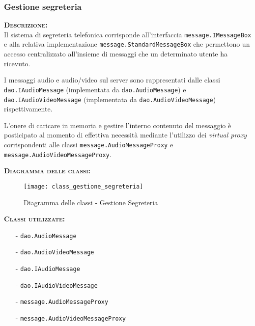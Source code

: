 \subsubsection{Gestione segreteria}
\begin{description}
	\item{\scshape\bfseries Descrizione:}\\
Il sistema di segreteria telefonica corrisponde all'interfaccia \texttt{message.IMessageBox} e alla relativa implementazione \texttt{message.StandardMessageBox} che permettono un accesso centralizzato all'insieme di messaggi che un determinato utente ha ricevuto.

I messaggi audio e audio/video sul server sono rappresentati dalle classi \texttt{dao.IAudioMessage} (implementata da \texttt{dao.AudioMessage}) e \texttt{dao.IAudioVideoMessage} (implementata da \texttt{dao.AudioVideoMessage}) rispettivamente.

L'onere di caricare in memoria e gestire l'interno contenuto del messaggio è posticipato al momento di effettiva necessità mediante l'utilizzo dei \textit{virtual proxy} corrispondenti alle classi \texttt{message.AudioMessageProxy} e \texttt{message.AudioVideoMessageProxy}.
	\item{\scshape\bfseries Diagramma delle classi:}
\begin{figure}[H]
\begin{center}
\texttt{[image: class\_gestione\_segreteria]}
\caption{Diagramma delle classi - Gestione Segreteria}\label{fig:gestione_segreteria}
\end{center}
\end{figure}	
	
	\item{\scshape\bfseries Classi utilizzate:}
	\begin{itemize}[noitemsep,nolistsep]
	  \item[-] \texttt{dao.AudioMessage}
	  \item[-] \texttt{dao.AudioVideoMessage}
	  \item[-] \texttt{dao.IAudioMessage}
	  \item[-] \texttt{dao.IAudioVideoMessage}
	  \item[-] \texttt{message.AudioMessageProxy}
	  \item[-] \texttt{message.AudioVideoMessageProxy}
	\end{itemize}
\end{description}

